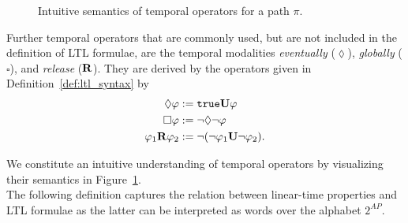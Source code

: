 \documentclass[a4paper, 12pt, twoside]{report}
\begin{document}
\begin{figure}
\begin{center}
			\caption{Intuitive semantics of temporal operators for a path $\pi$.}\label{fig:temporal_ops}
		\end{center}
	\end{figure}	

	Further temporal operators that are commonly used, but are not included in the definition of LTL formulae, are the temporal modalities \textit{eventually}  ($\lozenge$), \textit{globally} ($\square$), and \textit{release} ($\textbf{\textup{R}}$). They are derived by the operators given in Definition~\ref{def:ltl_syntax} by 	
	\begin{align*}		
		\lozenge \varphi &:= \texttt{\textup{true}} \textbf{\textup{U}} \varphi\\
		\square \varphi &:= \neg \lozenge\neg\varphi\\
		\varphi_1 \textbf{\textup{R}} \varphi_2 &:= \neg(\neg\varphi_1 \textbf{\textup{U}} \neg \varphi_2).
	\end{align*}
	
	We constitute an intuitive understanding of temporal operators by visualizing their semantics in Figure~\ref{fig:temporal_ops}.\\
	
	The following definition captures the relation between linear-time properties and LTL formulae as the latter can be interpreted as words over the alphabet $2^{AP}$.
	
\end{document}
